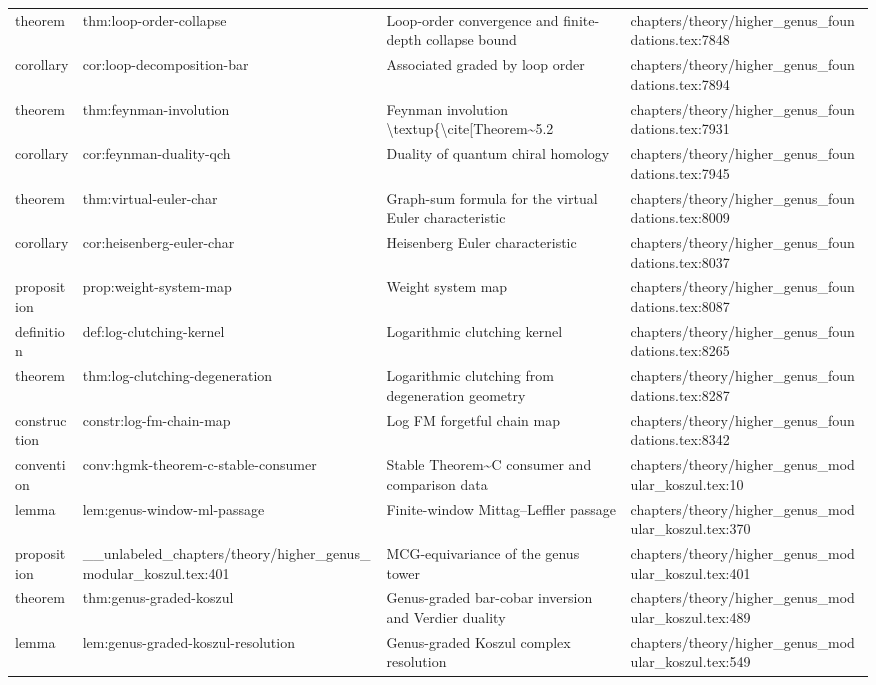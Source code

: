 \documentclass[11pt]{article}
\begin{document}
\begin{longtable}{L{0.10\textwidth}L{0.26\textwidth}L{0.42\textwidth}L{0.22\textwidth}}
theorem & thm:loop-order-collapse & Loop-order convergence and finite-depth collapse bound & chapters/theory/higher\_genus\_foundations.tex:7848\\
corollary & cor:loop-decomposition-bar & Associated graded by loop order & chapters/theory/higher\_genus\_foundations.tex:7894\\
theorem & thm:feynman-involution & Feynman involution \textbackslash{}textup\{\textbackslash{}cite[Theorem\textasciitilde{}5.2 & chapters/theory/higher\_genus\_foundations.tex:7931\\
corollary & cor:feynman-duality-qch & Duality of quantum chiral homology & chapters/theory/higher\_genus\_foundations.tex:7945\\
theorem & thm:virtual-euler-char & Graph-sum formula for the virtual Euler characteristic & chapters/theory/higher\_genus\_foundations.tex:8009\\
corollary & cor:heisenberg-euler-char & Heisenberg Euler characteristic & chapters/theory/higher\_genus\_foundations.tex:8037\\
proposition & prop:weight-system-map & Weight system map & chapters/theory/higher\_genus\_foundations.tex:8087\\
definition & def:log-clutching-kernel & Logarithmic clutching kernel & chapters/theory/higher\_genus\_foundations.tex:8265\\
theorem & thm:log-clutching-degeneration & Logarithmic clutching from degeneration geometry & chapters/theory/higher\_genus\_foundations.tex:8287\\
construction & constr:log-fm-chain-map & Log FM forgetful chain map & chapters/theory/higher\_genus\_foundations.tex:8342\\
convention & conv:hgmk-theorem-c-stable-consumer & Stable Theorem\textasciitilde{}C consumer and comparison data & chapters/theory/higher\_genus\_modular\_koszul.tex:10\\
lemma & lem:genus-window-ml-passage & Finite-window Mittag--Leffler passage & chapters/theory/higher\_genus\_modular\_koszul.tex:370\\
proposition & \_\_unlabeled\_chapters/theory/higher\_genus\_modular\_koszul.tex:401 & MCG-equivariance of the genus tower & chapters/theory/higher\_genus\_modular\_koszul.tex:401\\
theorem & thm:genus-graded-koszul & Genus-graded bar-cobar inversion and Verdier duality & chapters/theory/higher\_genus\_modular\_koszul.tex:489\\
lemma & lem:genus-graded-koszul-resolution & Genus-graded Koszul complex resolution & chapters/theory/higher\_genus\_modular\_koszul.tex:549\\

\end{longtable}
\end{document}
